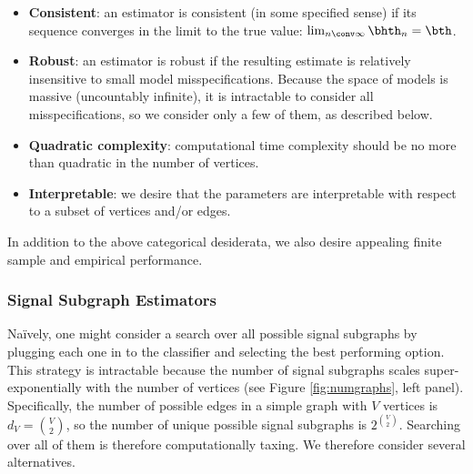 \documentclass[10pt,journal,cspaper,compsoc]{IEEEtran}
\begin{document}
\begin{itemize}
	\item \textbf{Consistent}: an estimator is consistent (in some specified sense) if its sequence converges in the limit to the true value: $\lim_{n \conv \infty} \bhth_n = \bth$.  %
	\item \textbf{Robust}: an estimator is robust if the resulting estimate is relatively insensitive to small model misspecifications.  Because the space of models is massive (uncountably infinite), it is intractable to consider all misspecifications, so we consider only a few of them, as described below.
	\item \textbf{Quadratic complexity}: computational time complexity should be no more than quadratic in the number of vertices.
	\item \textbf{Interpretable}: we desire that the parameters are interpretable with respect to a subset of vertices and/or edges.
\end{itemize}
In addition to the above categorical desiderata, we also desire appealing finite sample and empirical performance.


\subsubsection{Signal Subgraph Estimators} %
\label{ssub:subsubsection_name1}


Na\"{i}vely, one might consider a search over all possible signal subgraphs by plugging each one in to the classifier and selecting the best performing option.  This strategy is intractable because the number of signal subgraphs scales super-exponentially with the number of vertices (see Figure \ref{fig:numgraphs}, left panel). Specifically, the number of possible edges in a simple graph with $V$ vertices is $d_V=\binom{V}{2}$, so the number of unique possible signal subgraphs is $2^{\binom{V}{2}}$.  Searching over all of them is therefore computationally taxing. %
We therefore consider several alternatives.
\end{document}
